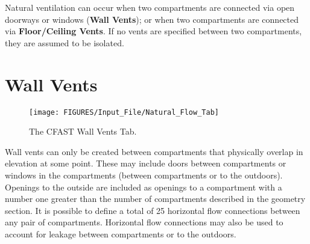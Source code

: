 Natural ventilation can occur when two compartments are connected via open doorways or windows (\textbf{Wall Vents}); or when two compartments are connected via \textbf{Floor/Ceiling Vents}. If no vents are specified between two compartments, they are assumed to be isolated.

\section{Wall Vents}

\begin{figure}[h!]
\begin{center}
\texttt{[image: FIGURES/Input\_File/Natural\_Flow\_Tab]}
\caption[The CFAST Wall Vents Tab]{The CFAST Wall Vents Tab.}
\end{center}
\end{figure}

Wall vents can only be created between compartments that physically overlap in elevation at some point. These may include doors between compartments or windows in the compartments (between compartments or to the outdoors).  Openings to the outside are included as openings to a compartment with a number one greater than the number of compartments described in the geometry section. It is possible to define a total of 25 horizontal flow connections between any pair of compartments. Horizontal flow connections may also be used to account for leakage between compartments or to the outdoors.

